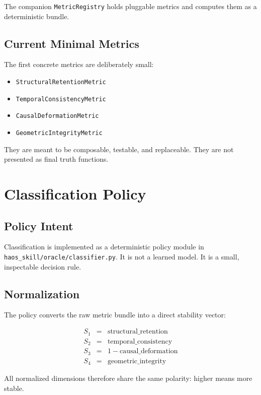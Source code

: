 \documentclass[11pt]{article}
\begin{document}
The companion \texttt{MetricRegistry} holds pluggable metrics and computes them as a deterministic bundle.

\subsection{Current Minimal Metrics}

The first concrete metrics are deliberately small:

\begin{itemize}
\item \texttt{StructuralRetentionMetric}
\item \texttt{TemporalConsistencyMetric}
\item \texttt{CausalDeformationMetric}
\item \texttt{GeometricIntegrityMetric}
\end{itemize}

They are meant to be composable, testable, and replaceable.
They are not presented as final truth functions.

\section{Classification Policy}

\subsection{Policy Intent}

Classification is implemented as a deterministic policy module in \texttt{haos\_skill/oracle/classifier.py}.
It is not a learned model.
It is a small, inspectable decision rule.

\subsection{Normalization}

The policy converts the raw metric bundle into a direct stability vector:

\[
\begin{array}{rcl}
S_1 & = & \mbox{structural\_retention} \\
S_2 & = & \mbox{temporal\_consistency} \\
S_3 & = & 1 - \mbox{causal\_deformation} \\
S_4 & = & \mbox{geometric\_integrity}
\end{array}
\]

All normalized dimensions therefore share the same polarity:
higher means more stable.
\end{document}
